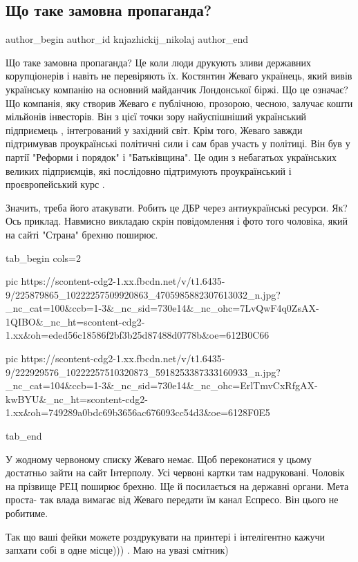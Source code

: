  
 
 
 
 
 
\subsection{Що таке замовна пропаганда?}
\label{sec:30_07_2021.fb.knjazhickij_nikolaj.1.propaganda}
 
\ifcmt
 author_begin
   author_id knjazhickij_nikolaj
 author_end
\fi

Що таке замовна пропаганда? Це коли люди друкують зливи державних корупціонерів
і навіть не перевіряють їх. Костянтин Жеваго українець, який вивів  українську
компанію на основний майданчик Лондонської біржі. Що це означає? Що компанія,
яку створив Жеваго є публічною, прозорою, чесною, залучає кошти мільйонів
інвесторів. Він з цієї точки зору найуспішніший український підприємець ,
інтегрований у західний світ. Крім того, Жеваго завжди підтримував
проукраїнські політичні сили і сам брав участь у політиці. Він був у партії
"Реформи і порядок" і "Батьківщина". Це один з небагатьох  українських великих
підприємців, які послідовно підтримують проукраїнський і проєвропейський  курс
. 

Значить, треба його атакувати. Робить це ДБР через антиукраїнські ресурси. Як?
Ось приклад. Навмисно викладаю скрін повідомлення і фото того чоловіка, який на
сайті "Страна" брехню поширює. 

\ifcmt
  tab_begin cols=2

     pic https://scontent-cdg2-1.xx.fbcdn.net/v/t1.6435-9/225879865_10222257509920863_4705985882307613032_n.jpg?_nc_cat=100&ccb=1-3&_nc_sid=730e14&_nc_ohc=7LvQwF4q0ZsAX-1QIBO&_nc_ht=scontent-cdg2-1.xx&oh=eded56c18586f2bf3b25d87488d0778b&oe=612B0C66

     pic https://scontent-cdg2-1.xx.fbcdn.net/v/t1.6435-9/222929576_10222257510320873_5918253387333160933_n.jpg?_nc_cat=104&ccb=1-3&_nc_sid=730e14&_nc_ohc=ErlTmvCxRfgAX-kwBYU&_nc_ht=scontent-cdg2-1.xx&oh=749289a0bdc69b3656ac676093cc54d3&oe=6128F0E5

  tab_end
\fi

У жодному червоному списку Жеваго немає. Щоб переконатися у цьому достатньо
зайти на сайт Інтерполу. Усі червоні картки там надруковані. Чоловік на
прізвище РЕЦ поширює брехню. Ще й посилається на державні органи. Мета проста-
так влада вимагає від Жеваго передати їм канал Еспресо. Він цього не робитиме.

Так що ваші фейки можете роздрукувати на принтері і інтелігентно кажучи запхати
собі в одне місце))) . Маю на увазі смітник)

